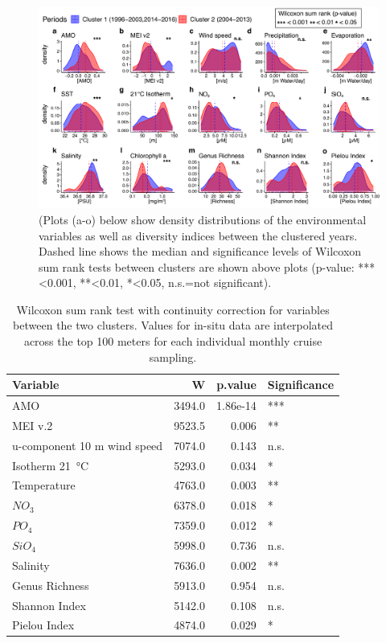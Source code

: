 \documentclass[draft]{agujournal2019}
\begin{document}
\begin{figure}
\noindent\includegraphics[width=\textwidth]{fig/Figure5_ClustCompPlot_v2.pdf}
\caption{(Plots (a-o) below show density distributions of the environmental variables as well as diversity indices between the clustered years. Dashed line shows the median and significance levels of Wilcoxon sum rank tests between clusters are shown above plots  (p-value: ***\textless0.001, **\textless0.01, *\textless0.05, n.s.=not significant).}
\label{fig:clustcomp}
\end{figure}


\begin{table}
\caption{Wilcoxon sum rank test with continuity correction for variables between the two clusters. Values for in-situ data are interpolated across the top 100 meters for each individual monthly cruise sampling.}
\label{table:clustering}
\centering
\begin{tabular}[t]{lrrl}
\toprule
Variable & W & p.value & Significance\\
\midrule
AMO & 3494.0 & 1.86e-14 & ***\\
MEI v.2 & 9523.5 & 0.006 & **\\
u-component 10 m wind speed & 7074.0 & 0.143 & n.s.\\
Isotherm \qty{21}{\celsius} & 5293.0 & 0.034 & *\\
\addlinespace
Temperature & 4763.0 & 0.003 & **\\
$NO_3$ & 6378.0 & 0.018 & *\\
$PO_4$ & 7359.0 & 0.012 & *\\
$SiO_4$ & 5998.0 & 0.736 & n.s.\\
Salinity & 7636.0 & 0.002 & **\\
\addlinespace
Genus Richness & 5913.0 & 0.954 & n.s.\\
Shannon Index & 5142.0 & 0.108 & n.s.\\
Pielou Index & 4874.0 & 0.029 & *\\
\bottomrule
\end{tabular}
\end{table}
\end{document}
